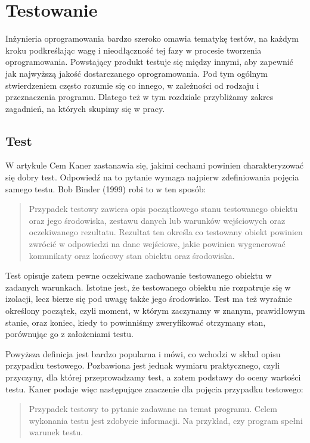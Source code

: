 \documentclass[00-praca-magisterska.tex]{subfiles}
\begin{document}
\chapter{Testowanie}
\label{testowanie}

Inżynieria oprogramowania bardzo szeroko omawia tematykę testów, na każdym
kroku podkreślając wagę i nieodłączność tej fazy w procesie tworzenia
oprogramowania.  Powstający produkt testuje się między innymi, aby zapewnić jak
najwyższą jakość dostarczanego oprogramowania. Pod tym ogólnym stwierdzeniem
często rozumie się co innego, w zależności od rodzaju i przeznaczenia programu.
Dlatego też w tym rozdziale przybliżamy zakres zagadnień, na których skupimy
się w pracy.

\section{Test}
\label{test}

W artykule \cite{good-test} Cem Kaner zastanawia się, jakimi cechami powinien
charakteryzować się dobry test.  Odpowiedź na to pytanie wymaga najpierw
zdefiniowania pojęcia samego testu. Bob Binder (1999) robi to w ten sposób:

\begin{quote}
Przypadek testowy zawiera opis początkowego stanu testowanego obiektu oraz jego
środowiska, zestawu danych lub warunków wejściowych oraz oczekiwanego
rezultatu. Rezultat ten określa co testowany obiekt powinien zwrócić w
odpowiedzi na dane wejściowe, jakie powinien wygenerować komunikaty oraz
końcowy stan obiektu oraz środowiska.
\end{quote}

Test opisuje zatem pewne oczekiwane zachowanie testowanego obiektu w zadanych
warunkach. Istotne jest, że testowanego obiektu nie rozpatruje się w izolacji,
lecz bierze się pod uwagę także jego środowisko. Test ma też wyraźnie określony
początek, czyli moment, w którym zaczynamy w znanym, prawidłowym stanie, oraz
koniec, kiedy to powinniśmy zweryfikować otrzymany stan, porównując go z
założeniami testu.

Powyższa definicja jest bardzo popularna i mówi, co wchodzi w skład opisu
przypadku testowego. Pozbawiona jest jednak wymiaru praktycznego, czyli
przyczyny, dla której przeprowadzamy test, a zatem podstawy do oceny wartości
testu. Kaner \cite{good-test} podaje więc następujące znaczenie dla pojęcia
przypadku testowego:

\begin{quote}Przypadek testowy to pytanie zadawane na temat programu. Celem
wykonania testu jest zdobycie informacji. Na przykład, czy program spełni
warunek testu.
\end{quote}
\end{document}

